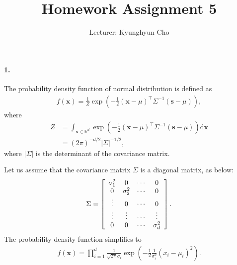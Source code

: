\documentclass{article}
\newcommand{\vect}[1]{\mathbf{#1}}
\newcommand{\vx}[0]{\vect{x}}
\newcommand{\vs}[0]{\vect{s}}
\newcommand{\RR}[0]{\mathbb{R}}
\newcommand{\dd}[1]{\ensuremath{\mbox{d}#1}}
\begin{document}
\title{Homework Assignment 5}
\author{Lecturer: Kyunghyun Cho}

\maketitle
{}

\paragraph{1.} 

The probability density function of normal distribution is defined as 
\begin{align*}
    f(\vx) = \frac{1}{Z} \exp\left( 
        -\frac{1}{2} (\vx - \mu)^\top \Sigma^{-1} (\vs - \mu)
    \right),
\end{align*}
where 
\begin{align*}
    Z &= \int_{\vx \in \RR^d} \exp\left( 
        -\frac{1}{2} (\vx - \mu)^\top \Sigma^{-1} (\vs - \mu)
    \right) \dd \vx \\
    &= (2\pi)^{-d/2} |\Sigma|^{-1/2},
\end{align*}
where $|\Sigma|$ is the determinant of the covariance matrix.

Let us assume that the covariance matrix $\Sigma$ is a diagonal matrix, as
below:
\begin{align*}
    \Sigma = \left[
        \begin{array}{c c c c}
            \sigma_1^2 & 0 & \cdots & 0 \\
            0 & \sigma_2^2 & \cdots & 0 \\
            \vdots & 0 & \cdots & 0 \\
            \vdots & \vdots & \cdots & \vdots \\
            0 & 0 & \cdots & \sigma_d^2 
        \end{array}
    \right].
\end{align*}
The probability density function simplifies to
\begin{align*}
    f(\vx) = \prod_{i=1}^d 
    \frac{1}{\sqrt{2\pi} \sigma_i}
    \exp\left(
        -\frac{1}{2} \frac{1}{\sigma_i^2}(x_i - \mu_i)^2
    \right).
\end{align*}
\end{document}
